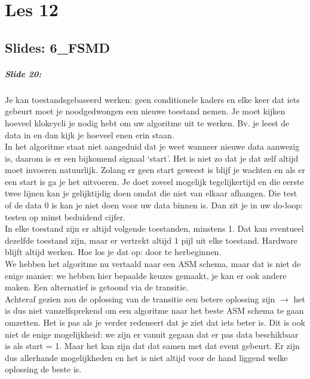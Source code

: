 \documentclass[10pt,a4paper]{book}
\begin{document}
\chapter{Les 12}

\section{Slides: 6\_FSMD}

\paragraph{Slide 20:} Je kan toestandsgebaseerd werken: geen conditionele kaders en elke keer dat iets gebeurt moet je noodgedwongen een nieuwe toestand nemen. Je moet kijken hoeveel klokcycli je nodig hebt om uw algoritme uit te werken. Bv. je leest de data in en dan kijk je hoeveel enen erin staan.\\
In het algoritme staat niet aangeduid dat je weet wanneer nieuwe data aanwezig is, daarom is er een bijkomend signaal `start'. Het is niet zo dat je dat zelf altijd moet invoeren natuurlijk. Zolang er geen start geweest is blijf je wachten en als er een start is ga je het uitvoeren. Je doet zoveel mogelijk tegelijkertijd en die eerste twee lijnen kan je gelijktijdig doen omdat die niet van elkaar afhangen. Die test of de data 0 is kan je niet doen voor uw data binnen is. Dan zit je in uw do-loop: testen op minst beduidend cijfer.\\
In elke toestand zijn er altijd volgende toestanden, minstens 1. Dat kan eventueel dezelfde toestand zijn, maar er vertrekt altijd 1 pijl uit elke toestand. Hardware blijft altijd werken. Hoe los je dat op: door te herbeginnen.\\
We hebben het algoritme nu vertaald naar een ASM schema, maar dat is niet de enige manier: we hebben hier bepaalde keuzes gemaakt, je kan er ook andere maken. Een alternatief is getoond via de transitie.\\
Achteraf gezien zou de oplossing van de transitie een betere oplossing zijn $\rightarrow$ het is dus niet vanzelfsprekend om een algoritme naar het beste ASM schema te gaan omzetten. Het is pas als je verder redeneert dat je ziet dat iets beter is. Dit is ook niet de enige mogelijkheid: we zijn er vanuit gegaan dat er pas data beschikbaar is als start = 1. Maar het kan zijn dat dat samen met dat event gebeurt. Er zijn dus allerhande mogelijkheden en het is niet altijd voor de hand liggend welke oplossing de beste is.
\end{document}
